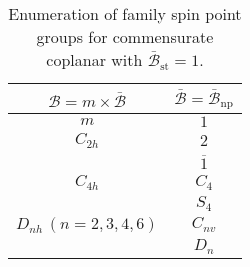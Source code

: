 \begin{table}[tb]
  \centering
  \caption{
    Enumeration of family spin point groups for commensurate coplanar with $\bar{\mathcal{B}}_{\mathrm{st}} = 1$.
  }
  \label{tab:spin_point_group_coplanar_st1}
  \begin{tabular}{cc}
    \hline \hline
    $\mathcal{B} = m \times \bar{\mathcal{B}}$
        & $\bar{\mathcal{B}} = \bar{\mathcal{B}}_{\mathrm{np}}$  %
        \\
    \hline
    $m$                          & $1$            \\
    $C_{2h}$                     & $2$            \\
                                 & $\overline{1}$ \\
    $C_{4h}$                     & $C_{4}$        \\
                                 & $S_{4}$        \\
    $D_{nh} \, (n = 2, 3, 4, 6)$ & $C_{nv}$       \\
                                 & $D_{n}$        \\
    \hline \hline
  \end{tabular}
\end{table}

